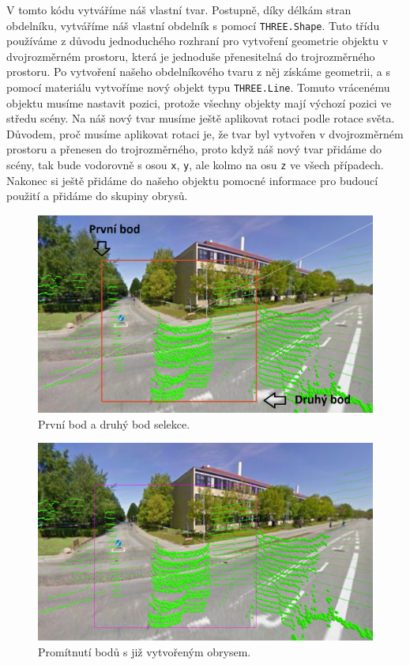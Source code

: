 \documentclass[czech,bachelor,dept420,male,cpdeclaration]{diploma}
\begin{document}
 

V tomto kódu vytváříme náš vlastní tvar. Postupně, díky délkám stran obdelníku, vytváříme náš vlastní obdelník s pomocí \texttt{THREE.Shape}. Tuto třídu používáme z důvodu jednoduchého rozhraní pro vytvoření geometrie objektu v dvojrozměrném prostoru, která je jednoduše přenesitelná do trojrozměrného prostoru. Po vytvoření našeho obdelníkového tvaru z něj získáme geometrii, a s pomocí materiálu vytvoříme nový objekt typu \texttt{THREE.Line}. Tomuto vrácenému objektu musíme nastavit pozici, protože všechny objekty mají výchozí pozici ve středu scény. Na náš nový tvar musíme ještě aplikovat rotaci podle rotace světa. Důvodem, proč musíme aplikovat rotaci je, že tvar byl vytvořen v dvojrozměrném prostoru a přenesen do trojrozměrného, proto když náš nový tvar přidáme do scény, tak bude vodorovně s osou \texttt{x}, \texttt{y}, ale kolmo na osu \texttt{z} ve všech případech. Nakonec si ještě přidáme do našeho objektu pomocné informace pro budoucí použití a přidáme do skupiny obrysů.

\begin{figure}[H]
\centering
\includegraphics[width=\linewidth]{Figures/selectionBeforeProjection.png}
\caption{První bod a druhý bod selekce. }
\label{fig:selectionBefore}
\end{figure} 

\begin{figure}[H]
\centering
\includegraphics[width=\linewidth]{Figures/selectionAfterProjection.png}
\caption{Promítnutí bodů s již vytvořeným obrysem. }
\label{fig:selectionAfter}
\end{figure}
\end{document}
